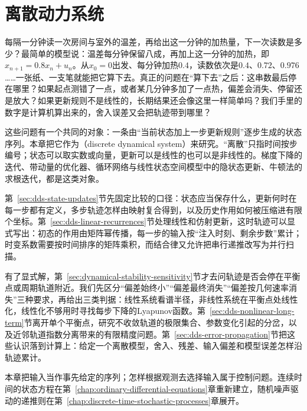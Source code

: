 \chapter{离散动力系统}
\label{chap:discrete-dynamical-systems}
\label{chap:action-and-state}
\label{chap:dynamical-systems-and-state-estimation}

每隔一分钟读一次房间与室外的温差，再给出这一分钟的加热量，下一次读数是多少？最简单的模型说：温差每分钟保留八成，再加上这一分钟的加热，即$x_{n+1}=0.8x_n+u_n$。从$x_0=0$出发、每分钟加热$0.4$，读数依次是$0.4$、$0.72$、$0.976$……一张纸、一支笔就能把它算下去。真正的问题在“算下去”之后：这串数最后停在哪里？如果起点测错了一点，或者某几分钟多加了一点热，偏差会消失、停留还是放大？如果更新规则不是线性的，长期结果还会像这里一样简单吗？我们手里的数字是计算机算出来的，舍入误差又会把轨迹带到哪里？

这些问题有一个共同的对象：一条由“当前状态加上一步更新规则”逐步生成的状态序列。本章把它作为（discrete dynamical system）来研究。“离散”只指时间按步编号；状态可以取实数或向量，更新可以是线性的也可以是非线性的。梯度下降的迭代、带动量的优化器、循环网络与线性状态空间模型中的隐状态更新、牛顿法的求根迭代，都是这类对象。

第~\ref{sec:dds-state-updates}节先固定比较的口径：状态应当保存什么，更新何时在每一步都有定义，多步轨迹怎样由映射复合得到，以及历史作用如何被压缩进有限个坐标。第~\ref{sec:dds-linear-recurrences}节处理线性和仿射更新，这时轨迹可以显式写出：初态的作用由矩阵幂传播，每一步的输入按“注入时刻、剩余步数”累计；时变系数需要按时间排序的矩阵乘积，而结合律又允许把串行递推改写为并行扫描。

有了显式解，第~\ref{sec:dynamical-stability-sensitivity}节才去问轨迹是否会停在平衡点或周期轨道附近。我们先区分“偏差始终小”“偏差最终消失”“偏差按几何速率消失”三种要求，再给出三类判据：线性系统看谱半径，非线性系统在平衡点处线性化，线性化不够用时寻找每步下降的Lyapunov函数。第~\ref{sec:dds-nonlinear-long-term}节离开单个平衡点，研究不收敛轨道的极限集合、参数变化引起的分岔，以及近邻轨道指数分离带来的有限精度问题。第~\ref{sec:dds-error-propagation}节把这些认识落到计算上：给定一个离散模型，舍入、残差、输入偏差和模型误差怎样沿轨迹累计。

本章把输入当作事先给定的序列；怎样根据观测去选择输入属于控制问题。连续时间的状态方程在第~\ref{chap:ordinary-differential-equations}章重新建立，随机噪声驱动的递推则在第~\ref{chap:discrete-time-stochastic-processes}章展开。







